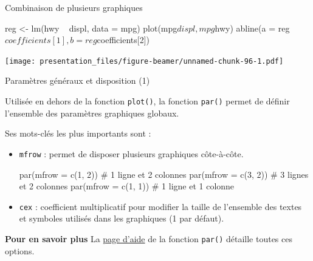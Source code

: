 \documentclass[12pt,ignorenonframetext,handout,]{beamer}
\newenvironment{Shaded}{}{}
\newcommand{\CommentTok}[1]{\textcolor[rgb]{0.00,0.50,0.00}{#1}}
\newcommand{\DataTypeTok}[1]{#1}
\newcommand{\DecValTok}[1]{#1}
\newcommand{\KeywordTok}[1]{\textcolor[rgb]{0.00,0.00,1.00}{#1}}
\newcommand{\NormalTok}[1]{#1}
\newcommand{\OperatorTok}[1]{#1}
\newcommand{\StringTok}[1]{\textcolor[rgb]{0.00,0.50,0.50}{#1}}
\renewenvironment{Shaded}{\begin{snugshade}}{\end{snugshade}}
\begin{document}
\begin{frame}[fragile]{Combinaison de plusieurs graphiques}
\protect\hypertarget{combinaison-de-plusieurs-graphiques-1}{}

\footnotesize

\begin{Shaded}
\begin{Highlighting}[]
\NormalTok{reg <-}\StringTok{ }\KeywordTok{lm}\NormalTok{(hwy }\OperatorTok{~}\StringTok{ }\NormalTok{displ, }\DataTypeTok{data =}\NormalTok{ mpg)}
\KeywordTok{plot}\NormalTok{(mpg}\OperatorTok{$}\NormalTok{displ, mpg}\OperatorTok{$}\NormalTok{hwy)}
\KeywordTok{abline}\NormalTok{(}\DataTypeTok{a =}\NormalTok{ reg}\OperatorTok{$}\NormalTok{coefficients[}\DecValTok{1}\NormalTok{], }\DataTypeTok{b =}\NormalTok{ reg}\OperatorTok{$}\NormalTok{coefficients[}\DecValTok{2}\NormalTok{])}
\end{Highlighting}
\end{Shaded}

\texttt{[image: presentation\_files/figure-beamer/unnamed-chunk-96-1.pdf]}

\end{frame}

\begin{frame}[fragile]{Paramètres généraux et disposition (1)}
\protect\hypertarget{parametres-generaux-et-disposition-1}{}

Utilisée en dehors de la fonction \texttt{plot()}, la fonction
\texttt{par()} permet de définir l’ensemble des paramètres graphiques
globaux.

\pause Ses mots-clés les plus importants sont :

\begin{itemize}
\item
  \texttt{mfrow} : permet de disposer plusieurs graphiques côte-à-côte.

\begin{Shaded}
\begin{Highlighting}[]
\KeywordTok{par}\NormalTok{(}\DataTypeTok{mfrow =} \KeywordTok{c}\NormalTok{(}\DecValTok{1}\NormalTok{, }\DecValTok{2}\NormalTok{)) }\CommentTok{# 1 ligne et 2 colonnes}
\KeywordTok{par}\NormalTok{(}\DataTypeTok{mfrow =} \KeywordTok{c}\NormalTok{(}\DecValTok{3}\NormalTok{, }\DecValTok{2}\NormalTok{)) }\CommentTok{# 3 lignes et 2 colonnes}
\KeywordTok{par}\NormalTok{(}\DataTypeTok{mfrow =} \KeywordTok{c}\NormalTok{(}\DecValTok{1}\NormalTok{, }\DecValTok{1}\NormalTok{)) }\CommentTok{# 1 ligne et 1 colonne}
\end{Highlighting}
\end{Shaded}
\item
  \texttt{cex} : coefficient multiplicatif pour modifier la taille de
  l’ensemble des textes et symboles utilisés dans les graphiques (1 par
  défaut).
\end{itemize}

\pause

\textbf{Pour en savoir plus} La
\href{http://stat.ethz.ch/R-manual/R-devel/library/graphics/html/par.html}{page
d’aide} de la fonction \texttt{par()} détaille toutes ces options.

\end{frame}
\end{document}

